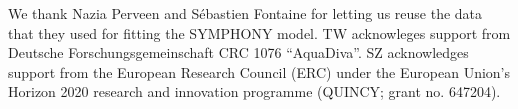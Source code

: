 \documentclass[authoryear,preprint,review,12pt]{elsarticle}
\begin{document}
\linenumbers


\begin{abstract}

\end{abstract}




\appendix

%



\begin{acknowledgements}
We thank Nazia Perveen and S\'{e}bastien Fontaine for letting us reuse the data
that they used for fitting the SYMPHONY model. TW acknowleges support from Deutsche Forschungsgemeinschaft CRC 1076
``AquaDiva''. SZ acknowledges support from the European Research Council (ERC)
under the European Union's Horizon 2020 research and innovation programme
(QUINCY; grant no. 647204).
\end{acknowledgements} 


 
 


\end{document}
